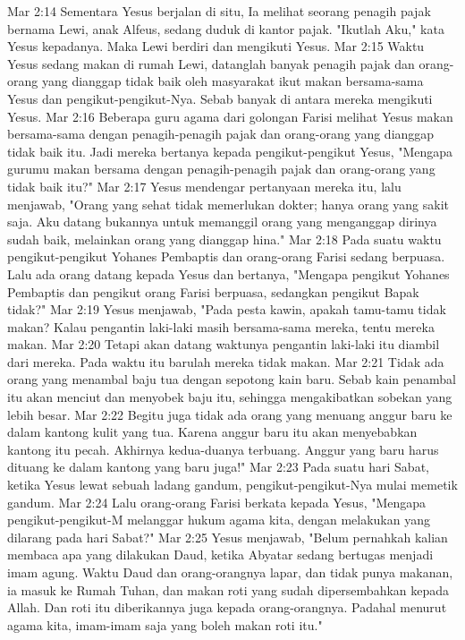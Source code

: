 Mar 2:14  Sementara Yesus berjalan di situ, Ia melihat seorang penagih pajak bernama Lewi, anak Alfeus, sedang duduk di kantor pajak. "Ikutlah Aku," kata Yesus kepadanya. Maka Lewi berdiri dan mengikuti Yesus.
Mar 2:15  Waktu Yesus sedang makan di rumah Lewi, datanglah banyak penagih pajak dan orang-orang yang dianggap tidak baik oleh masyarakat ikut makan bersama-sama Yesus dan pengikut-pengikut-Nya. Sebab banyak di antara mereka mengikuti Yesus.
Mar 2:16  Beberapa guru agama dari golongan Farisi melihat Yesus makan bersama-sama dengan penagih-penagih pajak dan orang-orang yang dianggap tidak baik itu. Jadi mereka bertanya kepada pengikut-pengikut Yesus, "Mengapa gurumu makan bersama dengan penagih-penagih pajak dan orang-orang yang tidak baik itu?"
Mar 2:17  Yesus mendengar pertanyaan mereka itu, lalu menjawab, "Orang yang sehat tidak memerlukan dokter; hanya orang yang sakit saja. Aku datang bukannya untuk memanggil orang yang menganggap dirinya sudah baik, melainkan orang yang dianggap hina."
Mar 2:18  Pada suatu waktu pengikut-pengikut Yohanes Pembaptis dan orang-orang Farisi sedang berpuasa. Lalu ada orang datang kepada Yesus dan bertanya, "Mengapa pengikut Yohanes Pembaptis dan pengikut orang Farisi berpuasa, sedangkan pengikut Bapak tidak?"
Mar 2:19  Yesus menjawab, "Pada pesta kawin, apakah tamu-tamu tidak makan? Kalau pengantin laki-laki masih bersama-sama mereka, tentu mereka makan.
Mar 2:20  Tetapi akan datang waktunya pengantin laki-laki itu diambil dari mereka. Pada waktu itu barulah mereka tidak makan.
Mar 2:21  Tidak ada orang yang menambal baju tua dengan sepotong kain baru. Sebab kain penambal itu akan menciut dan menyobek baju itu, sehingga mengakibatkan sobekan yang lebih besar.
Mar 2:22  Begitu juga tidak ada orang yang menuang anggur baru ke dalam kantong kulit yang tua. Karena anggur baru itu akan menyebabkan kantong itu pecah. Akhirnya kedua-duanya terbuang. Anggur yang baru harus dituang ke dalam kantong yang baru juga!"
Mar 2:23  Pada suatu hari Sabat, ketika Yesus lewat sebuah ladang gandum, pengikut-pengikut-Nya mulai memetik gandum.
Mar 2:24  Lalu orang-orang Farisi berkata kepada Yesus, "Mengapa pengikut-pengikut-M melanggar hukum agama kita, dengan melakukan yang dilarang pada hari Sabat?"
Mar 2:25  Yesus menjawab, "Belum pernahkah kalian membaca apa yang dilakukan Daud, ketika Abyatar sedang bertugas menjadi imam agung. Waktu Daud dan orang-orangnya lapar, dan tidak punya makanan, ia masuk ke Rumah Tuhan, dan makan roti yang sudah dipersembahkan kepada Allah. Dan roti itu diberikannya juga kepada orang-orangnya. Padahal menurut agama kita, imam-imam saja yang boleh makan roti itu."
